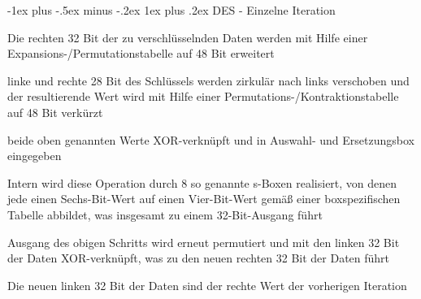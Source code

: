 \documentclass[a4paper]{article}
\makeatletter
\renewcommand{\subsubsection}{\@startsection{subsubsection}{3}{0mm}%
 {-1ex plus -.5ex minus -.2ex}%
 {1ex plus .2ex}%
 {\normalfont\small\bfseries}}
\makeatother
\begin{document}
\begin{multicols}{3}
      \subsubsection{DES - Einzelne Iteration}
      \begin{itemize*}
            \item Die rechten 32 Bit der zu verschlüsselnden Daten werden mit Hilfe einer Expansions-/Permutationstabelle auf 48 Bit erweitert
            \item linke und rechte 28 Bit des Schlüssels werden zirkulär nach links verschoben und der resultierende Wert wird mit Hilfe einer Permutations-/Kontraktionstabelle auf 48 Bit verkürzt
            \item beide oben genannten Werte XOR-verknüpft und in Auswahl- und Ersetzungsbox eingegeben
            \item Intern wird diese Operation durch 8 so genannte s-Boxen realisiert, von denen jede einen Sechs-Bit-Wert auf einen Vier-Bit-Wert gemäß einer boxspezifischen Tabelle abbildet, was insgesamt zu einem 32-Bit-Ausgang führt
            \item Ausgang des obigen Schritts wird erneut permutiert und mit den linken 32 Bit der Daten XOR-verknüpft, was zu den neuen rechten 32 Bit der Daten führt
            \item Die neuen linken 32 Bit der Daten sind der rechte Wert der vorherigen Iteration
      \end{itemize*}


\end{multicols}
\end{document}
